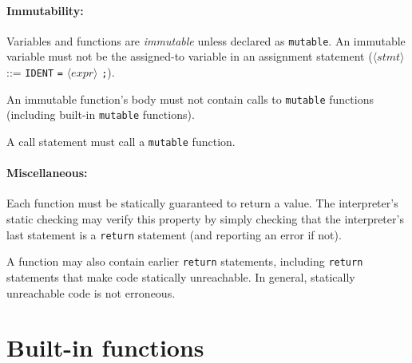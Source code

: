 \documentclass[10pt]{article}
\newcommand{\nt}[1]{\ensuremath{\langle \mathit{#1} \rangle}}
\newcommand{\tm}[1]{\texttt{#1}}
\begin{document}
\paragraph{Immutability:}

Variables and functions are \emph{immutable} unless declared as \tm{mutable}.
An immutable variable must not be the
assigned-to variable in an assignment statement
(\nt{stmt} ::= \tm{IDENT} \tm{=} \nt{expr} \tm {;}).

An immutable function's body must not contain
calls to \tm{mutable} functions (including built-in \tm{mutable} functions).

A call statement must call a \tm{mutable} function.

\paragraph{Miscellaneous:}

Each function must be statically guaranteed to return a value.
The interpreter's static checking may verify this property
by simply checking that the interpreter's last statement is a
\tm{return} statement (and reporting an error if not).

A function may also contain earlier \tm{return} statements,
including \tm{return} statements that make code statically unreachable.
In general, statically unreachable code is not erroneous.

\section{Built-in functions}
\end{document}

